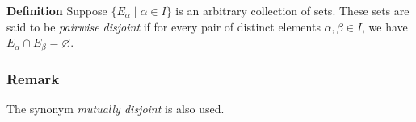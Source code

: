 \documentclass[12pt]{article}
\def\emptyset{\varnothing}
\begin{document}
{\bf Definition}
Suppose $\{ E_\alpha\mid \alpha \in I \}$ is an arbitrary collection of sets.
These sets are said to be \emph{pairwise disjoint}
if for every pair of distinct elements $\alpha,\beta\in I$,
we have $E_\alpha \cap E_\beta= \emptyset$.

\subsubsection*{Remark}
The synonym \emph{mutually disjoint} is also used.
\end{document}
